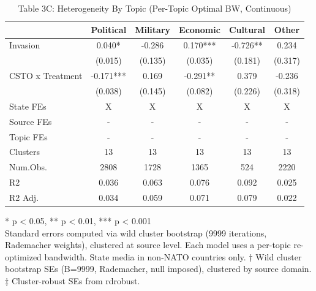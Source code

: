 \begin{table}[t]
\caption{\label{tab:table3c}Table 3C: Heterogeneity By Topic (Per-Topic Optimal BW, Continuous)} 
\fontsize{12.0pt}{14.0pt}\selectfont
\begin{tabular*}{\linewidth}{@{\extracolsep{\fill}}lccccc}
\toprule
  & Political & Military & Economic & Cultural & Other \\ 
\midrule\addlinespace[2.5pt]
Invasion & 0.040* & -0.286 & 0.170*** & -0.726** & 0.234 \\ 
 & (0.015) & (0.135) & (0.035) & (0.181) & (0.317) \\ 
CSTO x Treatment & -0.171*** & 0.169 & -0.291** & 0.379 & -0.236 \\ 
{} & {(0.038)} & {(0.145)} & {(0.082)} & {(0.226)} & {(0.318)} \\ 
State FEs & X & X & X & X & X \\ 
Source FEs & - & - & - & - & - \\ 
Topic FEs & - & - & - & - & - \\ 
Clusters & 13 & 13 & 13 & 13 & 13 \\ 
Num.Obs. & 2808 & 1728 & 1365 & 524 & 2220 \\ 
R2 & 0.036 & 0.063 & 0.076 & 0.092 & 0.025 \\ 
R2 Adj. & 0.034 & 0.059 & 0.071 & 0.079 & 0.022 \\ 
\bottomrule
\end{tabular*}
\begin{minipage}{\linewidth}
\vspace{.05em}
* p < 0.05, ** p < 0.01, *** p < 0.001\\
Standard errors computed via wild cluster bootstrap (9999 iterations, Rademacher
weights), clustered at source level. Each model uses a per-topic re-optimized
bandwidth. State media in non-NATO countries only. † Wild cluster bootstrap SEs
(B=9999, Rademacher, null imposed), clustered by source domain. ‡ Cluster-robust
SEs from rdrobust.\\
\end{minipage}
\end{table}

